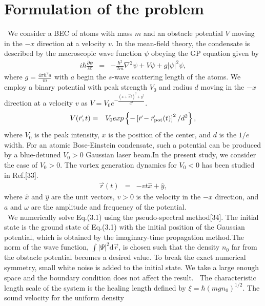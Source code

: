\documentclass[12pt,a4paper]{report} %
\newcommand{\diff}{\mathrm{d}}				%
\begin{document}
\section{Formulation of the problem}
\ We consider a BEC of atoms with mass $m$ and an obstacle potential $V$
moving in the $-x$ direction at a velocity $v$. In the mean-field theory,
the condensate is described by the macroscopic wave function $\psi$ obeying
the GP equation given by
\begin{eqnarray}
i \hbar \frac{\partial \psi}{\partial t} & = &
- \frac{\hbar^2}{2m} \nabla^2 \psi + V \psi + g | \psi |^2 \psi,
\end{eqnarray}
where $\displaystyle g = \frac{4 \pi \hbar^2 a}{m}$ with $a$ begin the 
$s$-wave scattering length of the atoms. We employ a binary potential with
peak strength $V_0$ and radius $d$ moving in the $-x$ direction
at a velocity $v$ as $V = V_0 e^{-\frac{(x+\vec{v}t)^2+y^2}{d^2}}$.
\\
\begin{eqnarray}
V( \vec{r}, t ) & = & V_0 exp 
\left\{
- \left[
\vec{r} - \vec{r}_{{\rm pot}} (t)
\right]^2 /d^2
\right\},
\end{eqnarray}
where $V_0$ is the peak intensity, $x$ is the position of the center, and $d$ is the $1/e$ width.
For an atomic Bose-Einstein condensate, such a potential can be produced by a blue-detuned $V_0 > 0$
Gaussian laser beam.In the present study, we consider the case of $V_0 > 0$.
The vortex generation dynamics for $V_0 < 0$ has been studied in Ref.[33].
\begin{eqnarray}
\vec{r} (t) & = & - v t \hat{x} + \hat{y},
\end{eqnarray}
where $\hat{x}$ and $\hat{y}$ are the unit vectors, $v > 0$ is the velocity in the $-x$ direction,
and $a$ and $\omega$ are the amplitude and frequency of the potential.
\\
\ We numerically solve Eq.(3.1) using the pseudo-spectral method[34]. The initial state is the ground state
of Eq.(3.1) with the initial position of the Gaussian potential, which is obtained by the
imaginary-time propagation method.The norm of the wave function, $\int |\Psi|^2 \diff \vec{r}$, is
chosen such that the density $n_0$ far from the obstacle potential becomes a desired value.
To break the exact numerical symmetry, small white noise is added to the initial state.
We take a large enough space and the boundary condition does not affect the result.
\ The characteristic length scale of the system is the healing length defined by
$\xi = \hbar(mg n_0)^{1/2}$. The sound velocity for the uniform density 
\end{document}
